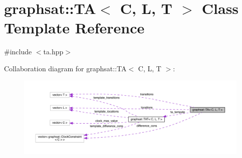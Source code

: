 \hypertarget{classgraphsat_1_1_t_a}{}\section{graphsat\+::TA$<$ C, L, T $>$ Class Template Reference}
\label{classgraphsat_1_1_t_a}


{\ttfamily \#include $<$ta.\+hpp$>$}



Collaboration diagram for graphsat\+::TA$<$ C, L, T $>$\+:
\nopagebreak
\begin{figure}[H]
\begin{center}
\leavevmode
\includegraphics[width=350pt]{classgraphsat_1_1_t_a__coll__graph}
\end{center}
\end{figure}
